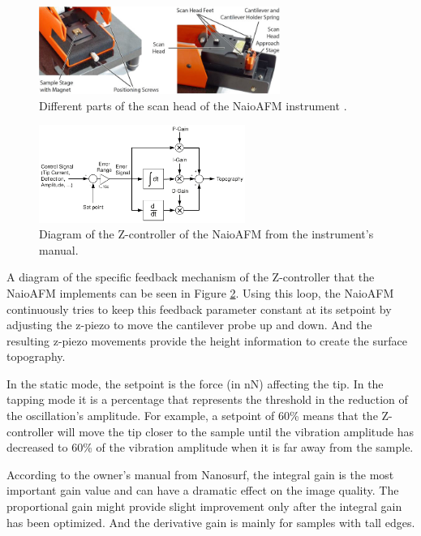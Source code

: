 \documentclass[11pt,a4paper]{article}
\begin{document}
\begin{figure}[hbt]
\centering
\includegraphics[width=0.7\textwidth]{naioafm2}
\caption{Different parts of the scan head of the NaioAFM instrument \cite{NaioAFM}.}
\label{fig:naioafm}
\end{figure}

\begin{figure}[hbt]
\centering
\includegraphics[width=0.6\textwidth]{Feedback_NaioAFM}
\caption{Diagram of the Z-controller of the NaioAFM from the instrument's manual.}
\label{fig:feedback_z-controller}
\end{figure}

A diagram of the specific feedback mechanism of the Z-controller that the NaioAFM implements can be seen in Figure \ref{fig:feedback_z-controller}. Using this loop, the NaioAFM continuously tries to keep this feedback parameter constant at its setpoint by adjusting the z-piezo to move the cantilever probe up and down. And the resulting z-piezo movements provide the height information to create the surface topography.

In the static mode, the setpoint is the force (in \si{\nano \N}) affecting the tip. In the tapping mode it is a percentage that represents the threshold in the reduction of the oscillation's amplitude. For example, a setpoint of 60\% means that the Z-controller will move the tip closer to the sample until the vibration amplitude has decreased to 60\% of the vibration amplitude when it is far away from the sample.

According to the owner's manual from Nanosurf, the integral gain is the most important gain value and can have a dramatic effect on the image quality. The proportional gain might provide slight improvement only after the integral gain has been optimized. And the derivative gain is mainly for samples with tall edges.
\end{document}
